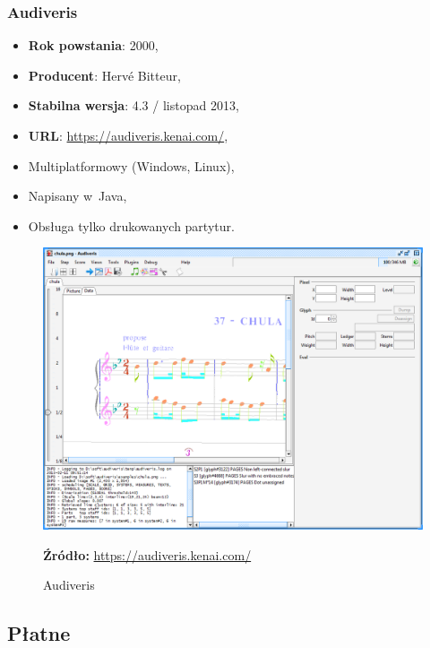 \documentclass[polish,thesis,12pt]{dcsbook}
\newcommand{\source}[2]{
  	\caption*{\textbf{Źródło:} \href{#1}{{#2}}}
}
\begin{document}
\subsubsection{Audiveris}
\begin{itemize}
  \item \textbf{Rok powstania}: 2000,
  \item \textbf{Producent}: Hervé Bitteur,
  \item \textbf{Stabilna wersja}: 4.3 / listopad 2013,
  \item \textbf{URL}: \url{https://audiveris.kenai.com/},
  \item Multiplatformowy (Windows, Linux),
  \item Napisany w~Java,
  \item Obsługa tylko drukowanych partytur.
\end{itemize}

\begin{figure}[H]
  \centering
  \includegraphics[scale=0.35,bb=0 0 1045 776]{img/audiveris.png}
  \caption{Audiveris}
  \label{audiveris}
  \source{https://audiveris.kenai.com/docs/manual/handbook.html}{https://audiveris.kenai.com/}
\end{figure}
\subsection{Płatne}
\end{document}

